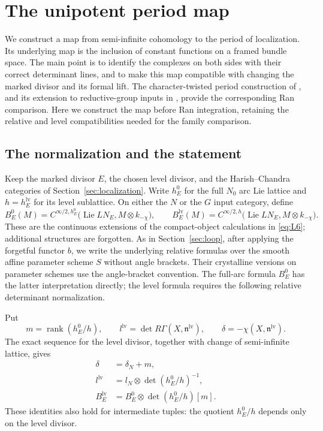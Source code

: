 \documentclass[11pt]{article}
\numberwithin{equation}{section}
\theoremstyle{definition}
\theoremstyle{remark}
\begin{document}
\section{The unipotent period map}\label{sec:unipotent}

We construct a map from semi-infinite cohomology to the period of
localization.  Its underlying map is the inclusion of constant functions
on a framed bundle space.  The main point is to identify the complexes
on both sides with their correct determinant lines, and to make this map
compatible with changing the marked divisor and its formal lift.
The character-twisted period construction of
\cite[Section~12.5.17 and Theorem~12.5.18]{GLCII}, and its extension to
reductive-group inputs in \cite[Theorem~12.8.8]{GLCII}, provide the
corresponding Ran comparison.  Here we construct the map before Ran
integration, retaining the relative and level compatibilities needed
for the family comparison.

\subsection{The normalization and the statement}

Keep the marked divisor $E$, the chosen level divisor, and the
Harish--Chandra categories of Section~\ref{sec:localization}.  Write
$h_E^0$ for the full $N_0$ arc Lie lattice and
$h=h_E^{\mathrm{lv}}$ for its level sublattice.  On either the $N$ or
the $G$ input category, define
\[
 B_E^0(M)=C^{\infty/2,h_E^0}
       \bigl(\operatorname{Lie}LN_E,M\otimes k_{-\chi}\bigr),
 \qquad
 B_E^{\mathrm{lv}}(M)=C^{\infty/2,h}
       \bigl(\operatorname{Lie}LN_E,M\otimes k_{-\chi}\bigr).
\]
These are the continuous extensions of the compact-object calculations
in \eqref{eq:L6}; additional structures are forgotten.  As in
Section~\ref{sec:loop}, after applying the forgetful functor $b$, we write the underlying
relative formulas over the smooth affine parameter scheme $S$ without
angle brackets.  Their crystalline versions on parameter
schemes use the angle-bracket convention.  The full-arc formula
$B_E^0$ has the latter interpretation directly; the level formula
requires the following relative determinant normalization.

Put
\[
 m=\operatorname{rank}(h_E^0/h),\qquad
 l^{\mathrm{lv}}=\det R\Gamma(X,\mathfrak n^{\mathrm{lv}}),\qquad
 \delta=-\chi(X,\mathfrak n^{\mathrm{lv}}).
\]
The exact sequence for the level divisor, together with change of
semi-infinite lattice, gives
\begin{equation}\label{eq:T9}
 \begin{aligned}
 \delta&=\delta_N+m,\\
 l^{\mathrm{lv}}
   &=l_N\otimes\det(h_E^0/h)^{-1},\\
 B_E^{\mathrm{lv}}
   &=B_E^0\otimes\det(h_E^0/h)[m].
 \end{aligned}
\end{equation}
These identities also hold for intermediate tuples: the quotient
$h_E^0/h$ depends only on the level divisor.
\end{document}
